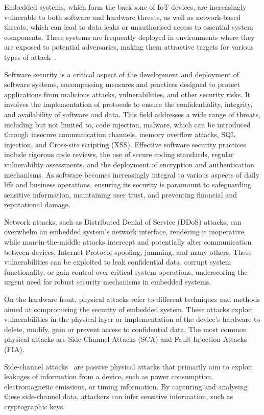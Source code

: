 Embedded systems, which form the backbone of IoT devices, are increasingly vulnerable to both software and hardware threats, as well as network-based threats, which can lead to data leaks or unauthorised access to essential system components. These systems are frequently deployed in environments where they are exposed to potential adversaries, making them attractive targets for various types of attack~\cite{MW-19-compnet, EAJJMB-22-compscrev}.

Software security is a critical aspect of the development and deployment of software systems, encompassing measures and practices designed to protect applications from malicious attacks, vulnerabilities, and other security risks. It involves the implementation of protocols to ensure the confidentiality, integrity, and availability of software and data. This field addresses a wide range of threats, including but not limited to, code injection, malware, which can be introduced through insecure communication channels, memory overflow attacks, SQL injection, and Cross-site scripting (XSS). Effective software security practices include rigorous code reviews, the use of secure coding standards, regular vulnerability assessments, and the deployment of encryption and authentication mechanisms. As software becomes increasingly integral to various aspects of daily life and business operations, ensuring its security is paramount to safeguarding sensitive information, maintaining user trust, and preventing financial and reputational damage.

Network attacks, such as Distributed Denial of Service (DDoS) attacks, can overwhelm an embedded system's network interface, rendering it inoperative, while man-in-the-middle attacks intercept and potentially alter communication between devices, Internet Protocol spoofing, jamming, and many others. These vulnerabilities can be exploited to leak confidential data, corrupt system functionality, or gain control over critical system operations, underscoring the urgent need for robust security mechanisms in embedded systems.

On the hardware front, physical attacks refer to different techniques and methods aimed at compromising the security of embedded system. These attacks exploit vulnerabilities in the physical layer or implementation of the device’s hardware to delete, modify, gain or prevent access to confidential data.
The most common physical attacks are Side-Channel Attacks (SCA) and Fault Injection Attacks (FIA).

Side-channel attacks~\cite{DM-21-appiot} are passive physical attacks that primarily aim to exploit leakages of information from a device, such as power consumption, electromagnetic emissions, or timing information. By capturing and analysing these side-channel data, attackers can infer sensitive information, such as cryptographic keys.

